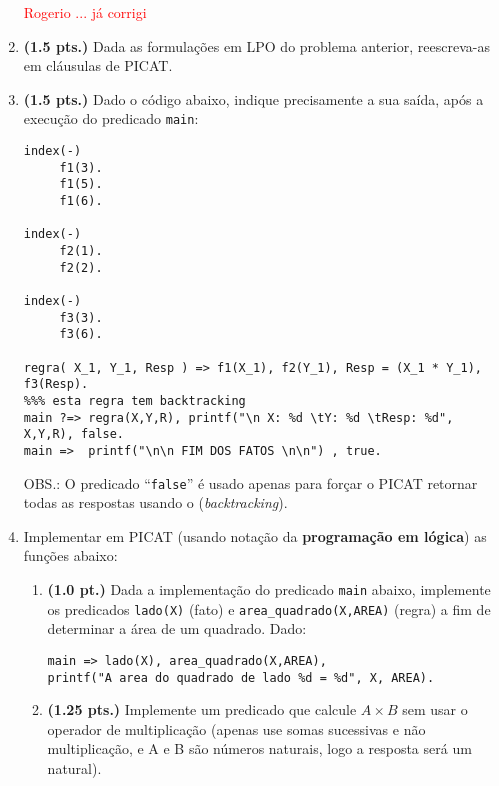 \documentclass[a4paper,11pt]{article}
\begin{document}
\begin{enumerate}
 \textcolor{red}{Rogerio ... já corrigi}

\item {\bf (1.5 pts.)} Dada as formulações em LPO do problema anterior, reescreva-as em cláusulas de  PICAT.
  
\item {\bf (1.5 pts.)} Dado o código abaixo, indique precisamente a sua saída, após   a execução do predicado \texttt{main}:

\begin{scriptsize}
\begin{verbatim}
index(-)      
     f1(3).
     f1(5).
     f1(6).
	
index(-)  
     f2(1).
     f2(2).
	
index(-)     
     f3(3).
     f3(6).
    
regra( X_1, Y_1, Resp ) => f1(X_1), f2(Y_1), Resp = (X_1 * Y_1), f3(Resp).
%%% esta regra tem backtracking
main ?=> regra(X,Y,R), printf("\n X: %d \tY: %d \tResp: %d", X,Y,R), false.
main =>  printf("\n\n FIM DOS FATOS \n\n") , true.
\end{verbatim}
\end{scriptsize}


OBS.: O predicado ``\texttt{false}''  é usado apenas para forçar o PICAT retornar todas as respostas usando o ({\em backtracking}). 

\newpage
\item Implementar em PICAT (usando notação da \textbf{programação em lógica}) as funções abaixo:

\begin{enumerate}

   \item {\bf (1.0 pt.)} Dada a implementação do predicado {\tt main} abaixo, implemente os predicados {\tt lado(X)} (fato) e 
   {\tt area\_quadrado(X,AREA)} (regra) a fim de determinar a área de um quadrado. Dado: 
   
   \begin{footnotesize}
   {\tt main => lado(X), area\_quadrado(X,AREA),\\ printf("A area do quadrado de lado \%d = \%d", X, AREA).}
   \end{footnotesize}
   
   
   \item {\bf (1.25 pts.)} Implemente um predicado que calcule $A \times B	$ sem usar o operador de multiplicação (apenas use somas sucessivas e não multiplicação, e A e B são números naturais, logo a resposta será um natural).
   

\end{enumerate}
\end{enumerate}
\end{document}
